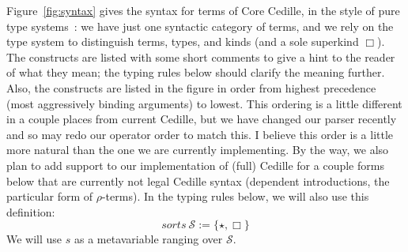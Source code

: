 \documentclass{article}
\begin{document}
Figure~\ref{fig:syntax} gives the syntax for terms of Core Cedille, in
the style of pure type systems~\cite{B92}: we have just one syntactic
category of terms, and we rely on the type system to distinguish
terms, types, and kinds (and a sole superkind $\Box$).  The constructs
are listed with some short comments to give a hint to the reader of
what they mean; the typing rules below should clarify the meaning
further.  Also, the constructs are listed in the figure in order from
highest precedence (most aggressively binding arguments) to lowest.
This ordering is a little different in a couple places from current
Cedille, but we have changed our parser recently and so may redo our
operator order to match this.  I believe this order is a little more
natural than the one we are currently implementing.  By the way, we
also plan to add support to our implementation of (full) Cedille for a
couple forms below that are currently not legal Cedille syntax
(dependent introductions, the particular form of $\rho$-terms).  In
the typing rules below, we will also use this definition:
\[
\textit{sorts}\ \mathcal{S} := \{ \star , \Box \}
\]
\noindent We will use $s$ as a metavariable ranging over $\mathcal{S}$.
\end{document}
